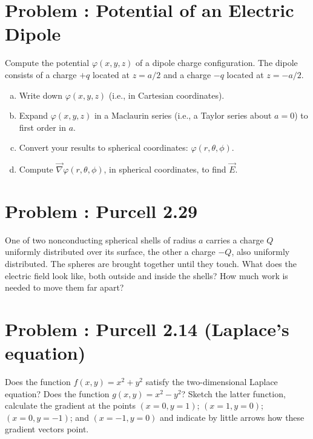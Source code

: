 \documentclass[problems]{esg8022pset}
\begin{document}
\section{Problem \thesection: Potential of an Electric Dipole}
  Compute the potential $\varphi(x,y,z)$ of a dipole charge configuration.  The dipole consists of a charge $+q$ located at $z = a/2$ and a charge $-q$ located at $z=-a / 2$.
  \begin{enumerate}[(a)]
    \item Write down $\varphi(x,y,z)$ (i.e., in Cartesian coordinates).
    \item Expand $\varphi(x,y,z)$ in a Maclaurin series (i.e., a Taylor series about $a=0$) to first order in $a$.
    \item Convert your results to spherical coordinates: $\varphi(r, \theta, \phi)$.
    \item Compute $\vec{\nabla}\varphi(r, \theta, \phi)$, in spherical coordinates, to find $\vec{E}$. %
  \end{enumerate}
\section{Problem \thesection: Purcell 2.29}
  One of two nonconducting spherical shells of radius $a$ carries
  a charge $Q$ uniformly distributed over its surface, the other a charge
  $-Q$, also uniformly distributed. The spheres are brought together
  until they touch. What does the electric field look like, both outside
  and inside the shells? How much work is needed to move them far
  apart?
\section{Problem \thesection: Purcell 2.14 (Laplace's equation)}
  Does the function $f(x, y) = x^2 + y^2$ satisfy the two-dimensional
  Laplace equation? Does the function $g(x, y) = x^2 - y^2$?
  Sketch the latter function, calculate the gradient at the points $(x = 0, y = 1)$;
  $(x = 1, y = 0)$; $(x = 0, y = -1)$; and $(x = -1, y = 0)$ and indicate
  by little arrows how these gradient vectors point.
\end{document}
